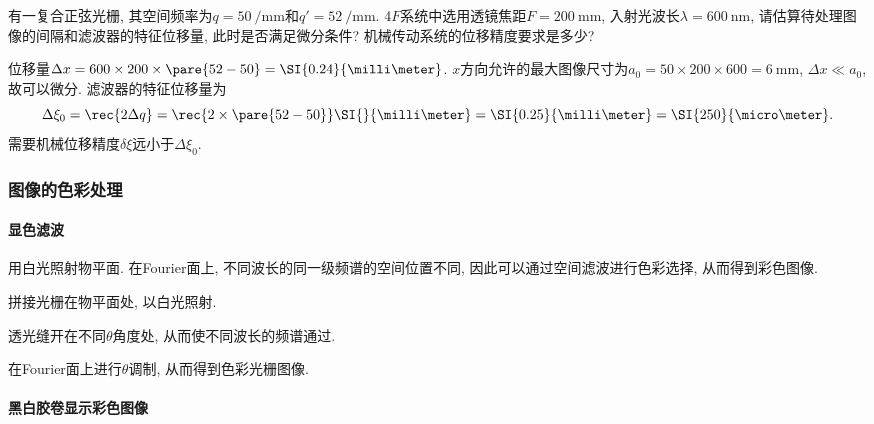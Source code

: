 \documentclass{ctexart}
\begin{document}

\begin{sample}
    \begin{ex}
        有一复合正弦光栅, 其空间频率为$q=\SI{50}{\per\milli\meter}$和$q'=\SI{52}{\per\milli\meter}$. 4$F$系统中选用透镜焦距$F=\SI{200}{\milli\meter}$, 入射光波长$\lambda = \SI{600}{\nano\meter}$, 请估算待处理图像的间隔和滤波器的特征位移量, 此时是否满足微分条件? 机械传动系统的位移精度要求是多少?
    \end{ex}
    \begin{solution}
        位移量$\Delta x = 600\times 200 \times \pare{52-50} = \SI{0.24}{\milli\meter}$. $x$方向允许的最大图像尺寸为$a_0 = 50\times 200\times 600 = \SI{6}{\milli\meter}$, $\Delta x \ll a_0$, 故可以微分. 滤波器的特征位移量为
        \[ \Delta\xi_0 = \rec{2\Delta q} = \rec{2\times\pare{52-50}}\SI{}{\milli\meter} = \SI{0.25}{\milli\meter} = \SI{250}{\micro\meter}. \]
        需要机械位移精度$\delta \xi$远小于$\Delta\xi_0$.
    \end{solution}
\end{sample}


\subsubsection{图像的色彩处理} %
\label{ssub:图像的色彩处理}

\paragraph{显色滤波} %
\label{par:显色滤波}

用白光照射物平面. 在Fourier面上, 不同波长的同一级频谱的空间位置不同, 因此可以通过空间滤波进行色彩选择, 从而得到彩色图像.

\begin{cenum}
    \item 拼接光栅在物平面处, 以白光照射.
    \item 透光缝开在不同$\theta$角度处, 从而使不同波长的频谱通过.
    \item 在Fourier面上进行$\theta$调制, 从而得到色彩光栅图像.
\end{cenum}


\paragraph{黑白胶卷显示彩色图像} %
\label{par:黑白胶卷显示彩色图像}
\end{document}
